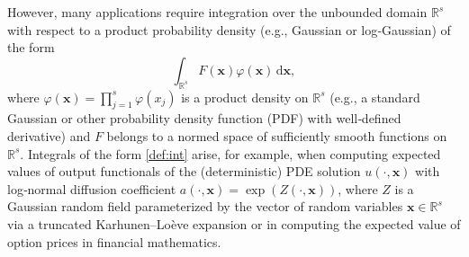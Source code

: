 \documentclass[namedate,webpdf,imanum]{ima-authoring-arxiv}%
\theoremstyle{thmstyletwo}%
\numberwithin{equation}{section}
\newcommand{\bsx}{\boldsymbol{x}}
\begin{document}
However, many applications require integration over the unbounded domain $\mathbb{R}^s$ with respect to a product probability density (e.g., Gaussian or log‐Gaussian) of the form
\begin{equation}\label{def:int}
\int_{\mathbb{R}^s} F(\bsx) \varphi(\bsx) \,\mathrm{d} \bsx,
\end{equation}
where 
$\varphi(\boldsymbol{x})=\prod_{j=1}^s\varphi(x_j)$ is a product density on $\mathbb{R}^s$ (e.g., a standard Gaussian or other probability density function (PDF) with well‐defined derivative) and $F$ belongs to a normed space of sufficiently smooth functions on $\mathbb{R}^s$. Integrals of the form \eqref{def:int} arise, for example, when computing expected values of output functionals of the (deterministic) PDE solution $u(\cdot,\boldsymbol x)$ with log‐normal diffusion coefficient $a(\cdot,\boldsymbol x)=\exp(Z(\cdot,\boldsymbol x))$, where $Z$ is a Gaussian random field parameterized by the vector of random variables $\boldsymbol x\in\mathbb{R}^s$ via a truncated Karhunen--Loève expansion or in computing the expected value of option prices in financial mathematics.
\end{document}
